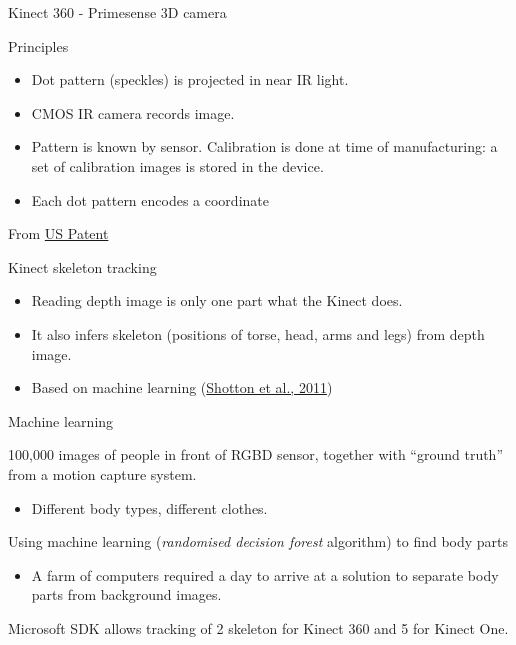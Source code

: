 \documentclass[compress]{beamer}
\begin{document}
\begin{frame}{Kinect 360 - Primesense 3D camera}

Principles

\begin{itemize}

\item
  Dot pattern (speckles) is projected in near IR light.
\item
  CMOS IR camera records image.
\item
  Pattern is known by sensor. Calibration is done at time of
  manufacturing: a set of calibration images is stored in the device.
\item
  Each dot pattern encodes a coordinate
\end{itemize}

From
\href{http://worldwide.espacenet.com/publicationDetails/originalDocument?FT=D\&date=20100909\&DB=EPODOC\&locale=en_EP\&CC=US\&NR=2010225746A1\&KC=A1}{US
Patent}

\end{frame}

\begin{frame}{Kinect skeleton tracking}

\begin{itemize}

\item
  Reading depth image is only one part what the Kinect does.
\item
  It also infers skeleton (positions of torse, head, arms and legs) from
  depth image.
\item
  Based on machine learning
  (\href{http://research.microsoft.com/pubs/145347/BodyPartRecognition.pdf}{Shotton
  et al., 2011})
\end{itemize}

\end{frame}

\begin{frame}{Machine learning}

100,000 images of people in front of RGBD sensor, together with ``ground
truth'' from a motion capture system.

\begin{itemize}

\item
  Different body types, different clothes.
\end{itemize}

Using machine learning (\emph{randomised decision forest} algorithm) to
find body parts

\begin{itemize}

\item
  A farm of computers required a day to arrive at a solution to separate
  body parts from background images.
\end{itemize}

Microsoft SDK allows tracking of 2 skeleton for Kinect 360 and 5 for
Kinect One.

\end{frame}
\end{document}
